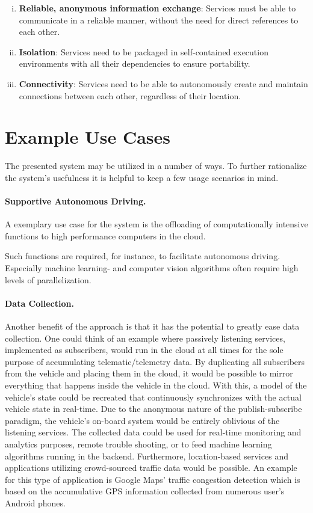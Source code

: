 \begin{enumerate}[(i)]
\item \textbf{Reliable, anonymous information exchange}: Services must be able to communicate in a reliable manner, without the need for direct references to each other.
\item \textbf{Isolation}: Services need to be packaged in self-contained execution environments with all their dependencies to ensure portability.
\item \textbf{Connectivity}: Services need to be able to autonomously create and maintain connections between each other, regardless of their location.
\end{enumerate}
%
%
%
%
%
%
%
%
%
%
\section{Example Use Cases} \label{sec:usecases}
The presented system may be utilized in a number of ways. To further rationalize the system's usefulness it is helpful to keep a few usage scenarios in mind.

\paragraph{Supportive Autonomous Driving.}
A exemplary use case for the system is the offloading of computationally intensive functions to high performance computers in the cloud. 


Such functions are required, for instance, to facilitate autonomous driving. Especially machine learning- and computer vision algorithms often require high levels of parallelization. 

\paragraph{Data Collection.} 
Another benefit of the approach is that it has the potential to greatly ease data collection. One could think of an example where passively listening services, implemented as subscribers, would run in the cloud at all times for the sole purpose of accumulating telematic/telemetry data. By duplicating all subscribers from the vehicle and placing them in the cloud, it would be possible to mirror everything that happens inside the vehicle in the cloud. With this, a model of the vehicle's state could be recreated that continuously synchronizes with the actual vehicle state in real-time. Due to the anonymous nature of the publish-subscribe paradigm, the vehicle's on-board system would be entirely oblivious of the listening services. The collected data could be used for real-time monitoring and analytics purposes, remote trouble shooting, or to feed machine learning algorithms running in the backend. Furthermore, location-based services and applications utilizing crowd-sourced traffic data would be possible. An example for this type of application is Google Maps' traffic congestion detection which is based on the accumulative GPS information collected from numerous user's Android phones.

